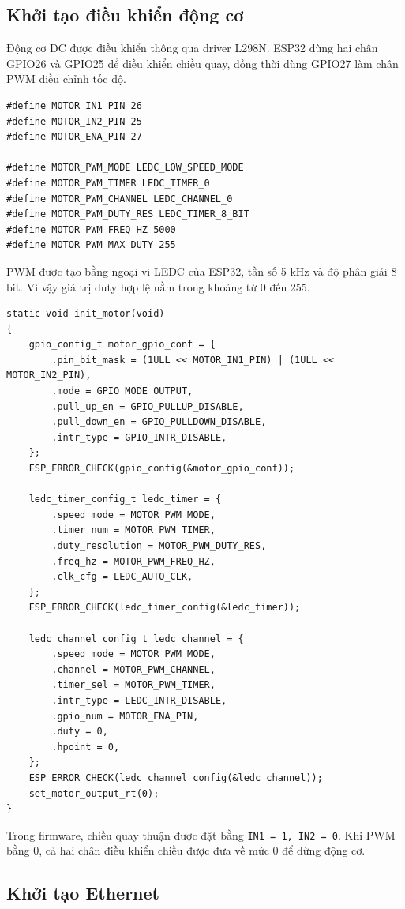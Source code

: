 \documentclass[12pt,a4paper]{report}
\begin{document}
\subsection{Khởi tạo điều khiển động cơ}

Động cơ DC được điều khiển thông qua driver L298N. ESP32 dùng hai chân GPIO26 và GPIO25 để điều khiển chiều quay, đồng thời dùng GPIO27 làm chân PWM điều chỉnh tốc độ.

\begin{lstlisting}
#define MOTOR_IN1_PIN 26
#define MOTOR_IN2_PIN 25
#define MOTOR_ENA_PIN 27

#define MOTOR_PWM_MODE LEDC_LOW_SPEED_MODE
#define MOTOR_PWM_TIMER LEDC_TIMER_0
#define MOTOR_PWM_CHANNEL LEDC_CHANNEL_0
#define MOTOR_PWM_DUTY_RES LEDC_TIMER_8_BIT
#define MOTOR_PWM_FREQ_HZ 5000
#define MOTOR_PWM_MAX_DUTY 255
\end{lstlisting}

PWM được tạo bằng ngoại vi LEDC của ESP32, tần số 5 kHz và độ phân giải 8 bit. Vì vậy giá trị duty hợp lệ nằm trong khoảng từ 0 đến 255.

\begin{lstlisting}
static void init_motor(void)
{
    gpio_config_t motor_gpio_conf = {
        .pin_bit_mask = (1ULL << MOTOR_IN1_PIN) | (1ULL << MOTOR_IN2_PIN),
        .mode = GPIO_MODE_OUTPUT,
        .pull_up_en = GPIO_PULLUP_DISABLE,
        .pull_down_en = GPIO_PULLDOWN_DISABLE,
        .intr_type = GPIO_INTR_DISABLE,
    };
    ESP_ERROR_CHECK(gpio_config(&motor_gpio_conf));

    ledc_timer_config_t ledc_timer = {
        .speed_mode = MOTOR_PWM_MODE,
        .timer_num = MOTOR_PWM_TIMER,
        .duty_resolution = MOTOR_PWM_DUTY_RES,
        .freq_hz = MOTOR_PWM_FREQ_HZ,
        .clk_cfg = LEDC_AUTO_CLK,
    };
    ESP_ERROR_CHECK(ledc_timer_config(&ledc_timer));

    ledc_channel_config_t ledc_channel = {
        .speed_mode = MOTOR_PWM_MODE,
        .channel = MOTOR_PWM_CHANNEL,
        .timer_sel = MOTOR_PWM_TIMER,
        .intr_type = LEDC_INTR_DISABLE,
        .gpio_num = MOTOR_ENA_PIN,
        .duty = 0,
        .hpoint = 0,
    };
    ESP_ERROR_CHECK(ledc_channel_config(&ledc_channel));
    set_motor_output_rt(0);
}
\end{lstlisting}

Trong firmware, chiều quay thuận được đặt bằng \texttt{IN1 = 1, IN2 = 0}. Khi PWM bằng 0, cả hai chân điều khiển chiều được đưa về mức 0 để dừng động cơ.

\subsection{Khởi tạo Ethernet}
\end{document}
